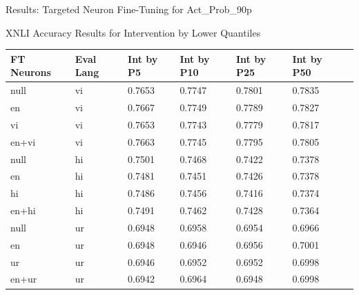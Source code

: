 \documentclass[aspectratio=169]{beamer}
\begin{document}
\begin{frame}{Results: Targeted Neuron Fine-Tuning for Act\_Prob\_90p}
	\begin{block}{\scriptsize XNLI Accuracy Results for Intervention by Lower Quantiles}\scriptsize
		\begin{table}[ht]
			\centering
			\renewcommand{\arraystretch}{1.3}
			\setlength{\tabcolsep}{4pt}
			\begin{tabularx}{\textwidth}{|X|X|X|X|X|X|X|}
				\hline
				\textbf{FT Neurons} & \textbf{Eval Lang} & \textbf{Int by P5} & \textbf{Int by P10} & \textbf{Int by P25} & \textbf{Int by P50} \\
				\hline
				null & vi & 0.7653 & 0.7747 & 0.7801 & 0.7835 \\
				en & vi & 0.7667 & 0.7749 & 0.7789 & 0.7827 \\
				vi & vi & 0.7653 & 0.7743 & 0.7779 & 0.7817 \\
				en+vi & vi & 0.7663 & 0.7745 & 0.7795 & 0.7805 \\
				\hline
				null & hi & 0.7501 & 0.7468 & 0.7422 & 0.7378 \\
				en & hi & 0.7481 & 0.7451 & 0.7426 & 0.7378 \\
				hi & hi & 0.7486 & 0.7456 & 0.7416 & 0.7374 \\
				en+hi & hi & 0.7491 & 0.7462 & 0.7428 & 0.7364 \\
				\hline
				null & ur & 0.6948 & 0.6958 & 0.6954 & 0.6966 \\
				en & ur & 0.6948 & 0.6946 & 0.6956 & 0.7001 \\
				ur & ur & 0.6946 & 0.6952 & 0.6952 & 0.6998 \\
				en+ur & ur & 0.6942 & 0.6964 & 0.6948 & 0.6998 \\
				\hline
			\end{tabularx}
		\end{table}
	\end{block}
\end{frame}	
	
\end{document}
